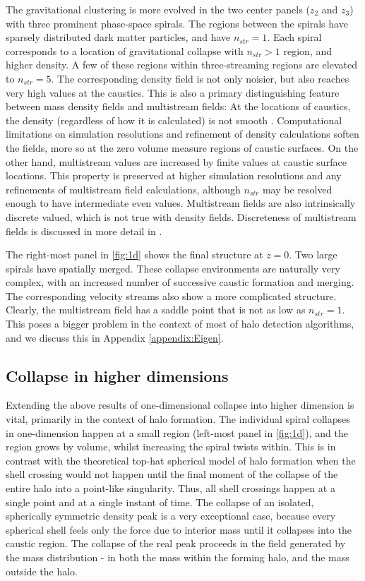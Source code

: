 The gravitational clustering is more evolved in the two center panels ($z_2$ and $z_3$) with three prominent phase-space spirals. The regions between the spirals have sparsely distributed dark matter particles, and have $n_{str} = 1$. Each spiral corresponds to a location of gravitational collapse with $n_{str} > 1$ region, and higher density. A few of these regions within three-streaming regions are elevated to $n_{str} = 5$. The corresponding density field is not only noisier, but also reaches very high values at the caustics. This is also a primary distinguishing feature between mass density fields and multistream fields: At the locations of caustics, the density (regardless of how it is calculated) is not smooth \cite{Vogelsberger2011}. Computational limitations on simulation resolutions and refinement of density calculations soften the fields, more so at the zero volume measure regions of caustic surfaces.  On the other hand, multistream values are increased by finite values at caustic surface locations. This property is preserved at higher simulation resolutions and any refinements of multistream field calculations, although $n_{str}$ may be resolved enough to have intermediate even values. Multistream fields are also intrinsically discrete valued, which is not true with density fields. Discreteness of multistream fields is discussed in more detail in \cite{Ramachandra2017}. 

The right-most panel in \autoref{fig:1d} shows the final structure at $z=0$. Two large spirals have spatially merged. These collapse environments are naturally very complex, with an increased number of successive caustic formation and merging. 
The corresponding velocity streams also show a more complicated structure. Clearly, the multistream field has a saddle point that is not as low as $n_{str} = 1$. This poses a bigger problem in the context of most of halo detection algorithms, and we discuss this in Appendix \ref{appendix:Eigen}. 



\subsection{Collapse in higher dimensions}

Extending the above results of one-dimensional collapse into higher dimension is vital, primarily in the context of halo formation. The individual spiral collapses in one-dimension happen at a small region (left-most panel in \autoref{fig:1d}), and the region grows by volume, whilst increasing the spiral twists within. This is in contrast with the theoretical top-hat spherical model of halo formation when the shell crossing would not happen until the final moment of the collapse of the entire halo into a point-like singularity. Thus, all shell crossings happen at a single point
and at a single instant of time. The collapse of an isolated, spherically symmetric density peak is a very exceptional case, because every spherical shell feels only the force due to interior mass until it collapses into the caustic region. The collapse of the real peak proceeds in the field generated by the mass distribution - in both the mass within the forming halo, and the mass outside the halo. 

